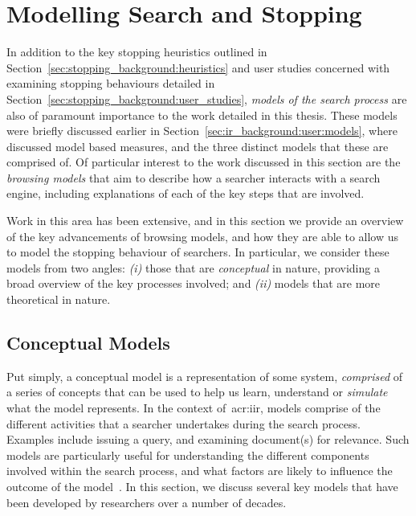 \section{Modelling Search and Stopping}\label{sec:stopping_background:models}
In addition to the key stopping heuristics outlined in Section~\ref{sec:stopping_background:heuristics} and user studies concerned with examining stopping behaviours detailed in Section~\ref{sec:stopping_background:user_studies}, \emph{models of the search process} are also of paramount importance to the work detailed in this thesis. These models were briefly discussed earlier in Section~\ref{sec:ir_background:user:models}, where~\cite{carterette2011models} discussed model based measures, and the three distinct models that these are comprised of. Of particular interest to the work discussed in this section are the \emph{browsing models} that aim to describe how a searcher interacts with a search engine, including explanations of each of the key steps that are involved.

Work in this area has been extensive, and in this section we provide an overview of the key advancements of browsing models, and how they are able to allow us to model the stopping behaviour of searchers. In particular, we consider these models from two angles: \emph{(i)} those that are \emph{conceptual} in nature, providing a broad overview of the key processes involved; and \emph{(ii)} models that are more theoretical in nature.


\subsection{Conceptual Models}\label{sec:stopping_background:models:conceptual}
Put simply, a conceptual model is a representation of some system, \emph{comprised} of a series of concepts that can be used to help us learn, understand or \emph{simulate} what the model represents. In the context of~\gls{acr:iir}, models comprise of the different activities that a searcher undertakes during the search process. Examples include issuing a query, and examining document(s) for relevance. Such models are particularly useful for understanding the different components involved within the search process, and what factors are likely to influence the outcome of the model~\citep{azzopardi2015theories}. In this section, we discuss several key models that have been developed by researchers over a number of decades.

